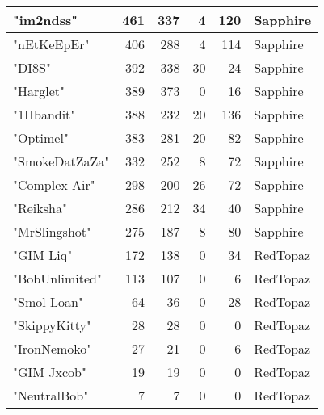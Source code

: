 \documentclass{article}
\begin{document}
\begin{table}[htbp]
\begin{tabular}{|l|r|r|r|r|l|}
"im2ndss" & 461 & 337 & 4 & 120 & Sapphire \\ \hline
"nEtKeEpEr" & 406 & 288 & 4 & 114 & Sapphire \\ \hline
"DI8S" & 392 & 338 & 30 & 24 & Sapphire \\ \hline
"Harglet" & 389 & 373 & 0 & 16 & Sapphire \\ \hline
"1Hbandit" & 388 & 232 & 20 & 136 & Sapphire \\ \hline
"Optimel" & 383 & 281 & 20 & 82 & Sapphire \\ \hline
"SmokeDatZaZa" & 332 & 252 & 8 & 72 & Sapphire \\ \hline
"Complex Air" & 298 & 200 & 26 & 72 & Sapphire \\ \hline
"Reiksha" & 286 & 212 & 34 & 40 & Sapphire \\ \hline
"MrSlingshot" & 275 & 187 & 8 & 80 & Sapphire \\ \hline
"GIM Liq" & 172 & 138 & 0 & 34 & RedTopaz \\ \hline
"BobUnlimited" & 113 & 107 & 0 & 6 & RedTopaz \\ \hline
"Smol Loan" & 64 & 36 & 0 & 28 & RedTopaz \\ \hline
"SkippyKitty" & 28 & 28 & 0 & 0 & RedTopaz \\ \hline
"IronNemoko" & 27 & 21 & 0 & 6 & RedTopaz \\ \hline
"GIM Jxcob" & 19 & 19 & 0 & 0 & RedTopaz \\ \hline
"NeutralBob" & 7 & 7 & 0 & 0 & RedTopaz \\ \hline
\end{tabular}
\end{table}
\end{document}
